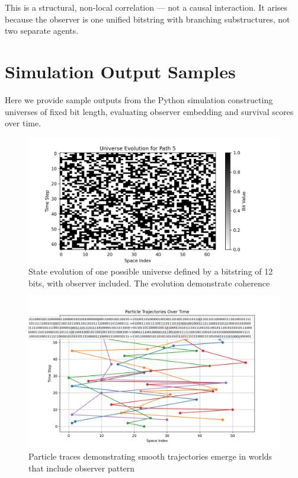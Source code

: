 \documentclass[12pt]{article}
\begin{document}
This is a structural, non-local correlation — not a causal interaction. It arises because the observer is one unified bitstring with branching substructures, not two separate agents.


\section{Simulation Output Samples}

Here we provide sample outputs from the Python simulation constructing universes of fixed bit length,
evaluating observer embedding and survival scores over time.


\begin{figure}[h!]
    \centering
    \includegraphics[width=1.0\textwidth]{figures/state_evolution_heatmap.png}
    \caption{State evolution of one possible universe defined by a bitstring of 12 bits, with observer included. The evolution
        demonstrate coherence}
    \label{fig:state_evolution}
\end{figure}

\begin{figure}[h!]
    \centering
    \includegraphics[width=1.0\textwidth]{figures/particle_trajectories.png}
    \caption{Particle traces demonstrating smooth trajectories emerge in worlds that include observer pattern}
    \label{fig:particle_trajectories}
\end{figure}
\end{document}
